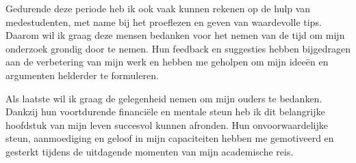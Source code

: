 Gedurende deze periode heb ik ook vaak kunnen rekenen op de hulp van medestudenten, met name bij het proeflezen en geven van waardevolle tips. Daarom wil ik graag deze mensen bedanken voor het nemen van de tijd om mijn onderzoek grondig door te nemen. Hun feedback en suggesties hebben bijgedragen aan de verbetering van mijn werk en hebben me geholpen om mijn ideeën en argumenten helderder te formuleren.
\clearpage

Als laatste wil ik graag de gelegenheid nemen om mijn ouders te bedanken. Dankzij hun voortdurende financiële en mentale steun heb ik dit belangrijke hoofdstuk van mijn leven succesvol kunnen afronden. Hun onvoorwaardelijke steun, aanmoediging en geloof in mijn capaciteiten hebben me gemotiveerd en gesterkt tijdens de uitdagende momenten van mijn academische reis.
\newline